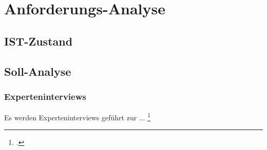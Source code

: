 \chapter{Anforderungs-Analyse}

\section{IST-Zustand}

\section{Soll-Analyse}

\subsection{Experteninterviews}

Es werden Experteninterviews geführt zur ... \footcite{wernitz_experteninterview_2018}